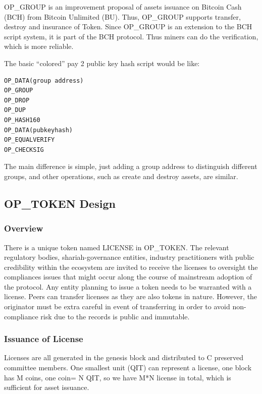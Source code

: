 \documentclass[a4paper,11pt]{article}
\begin{document}
OP\_GROUP\cite{OP_GROUP}  is an improvement proposal of assets issuance on Bitcoin Cash (BCH)\cite{BCH} from Bitcoin Unlimited (BU). Thus, OP\_GROUP  supports transfer, destroy and insurance of Token. Since OP\_GROUP is an extension to the BCH script system,  it is part of the BCH protocol. Thus miners can do the verification, which is more reliable.

The basic “colored” pay 2 public key hash script would be like:

\lstset{basicstyle=\tiny,style=myListStyle}
\begin{lstlisting}[numbers=none]
OP_DATA(group address)
OP_GROUP
OP_DROP
OP_DUP
OP_HASH160
OP_DATA(pubkeyhash)
OP_EQUALVERIFY
OP_CHECKSIG
\end{lstlisting}

The main difference is simple, just adding a group address to distinguish different groups, and other operations, such as create and destroy assets, are similar.


\subsection{OP\_TOKEN Design}

\subsubsection{Overview}

There is a unique token named LICENSE in OP\_TOKEN. The relevant regulatory bodies, shariah-governance entities, industry practitioners with public credibility within the ecosystem are invited to receive the licenses to oversight the compliances issues that might occur along the course of mainstream adoption of the protocol. Any entity planning to issue a token needs to be warranted with a license. Peers can transfer licenses as they are also tokens in nature. However, the originator must be extra careful in event of transferring in order to avoid non-compliance risk due to the records is public and immutable.  
 

\subsubsection{Issuance of License}

Licenses are all generated in the genesis block and distributed to C preserved committee members. One smallest unit (QIT) can represent a license, one block has M coins, one coin= N QIT, so we have M*N license in total, which is sufficient for asset issuance.
\end{document}
